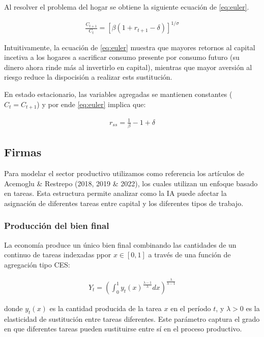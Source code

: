 \documentclass{article}
\theoremstyle{remark}
\theoremstyle{definition}
\begin{document}
Al resolver el problema del hogar se obtiene la siguiente ecuaci\'on de \ref{eq:euler}.

\begin{align*}
    \tag{Euler}
    \frac{C_{t+1}}{C_t} = \left[ \beta(1+r_{t+1}-\delta) \right]^{1/\sigma}
    \label{eq:euler}
\end{align*}

Intuitivamente, la ecuaci\'on de \ref{eq:euler} muestra que mayores retornos al capital incetiva a los hogares a sacrificar consumo presente por consumo futuro (su dinero ahora rinde m\'as al invertirlo en capital), mientras que mayor aversi\'on al riesgo reduce la dispocisi\'on a realizar ests sustituci\'on.

En estado estacionario, las variables agregadas se mantienen constantes ($C_{t} = C_{t+1}$) y por ende \ref{eq:euler} implica que:

\begin{align*}
  r_{ss} = \frac{1}{\beta} - 1 + \delta
\end{align*}

\subsection{Firmas}
Para modelar el sector productivo utilizamos como referencia los art\'iculos de Acemoglu \& Restrepo (2018, 2019 \& 2022), los cuales utilizan un enfoque basado en tareas. Esta estructura permite analizar como la IA puede afectar la asignaci\'on de diferentes tareas entre capital y los diferentes tipos de trabajo.

\subsubsection{Producci\'on del bien final}

La econom\'ia produce un \'unico bien final combinando las cantidades de un continuo de tareas indexadas ppor $x \in [0,1]$ a través de una funci\'on de agregaci\'on tipo CES:

\begin{align*}
    Y_t = \left( \int_0^1 y_t(x)^{\frac{\lambda-1}{\lambda}} dx \right)^{\frac{\lambda}{\lambda-1}}
\end{align*}

donde $y_t(x)$ es la cantidad producida de la tarea $x$ en el período $t$, y $\lambda > 0$ es la elasticidad de sustitución entre tareas diferentes. Este parámetro captura el grado en que diferentes tareas pueden sustituirse entre sí en el proceso productivo.
\end{document}
